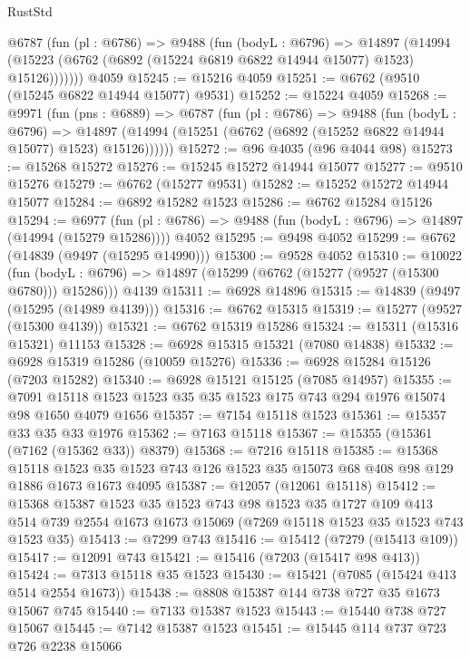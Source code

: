 \begin{lexlean}{RustStd}
\begin{coremodule}
      @6787
        (fun (pl : @6786) =>
        @9488
          (fun (bodyL : @6796) =>
          @14897
            (@14994 (@15223 (@6762 (@6892 (@15224 @6819 @6822 @14944 @15077) @1523) @15126)))))))
    @4059
@15245 := @15216 @4059
@15251 := @6762 (@9510 (@15245 @6822 @14944 @15077) @9531)
@15252 := @15224 @4059
@15268 := @9971
    (fun (pns : @6889) =>
    @6787
      (fun (pl : @6786) =>
      @9488
        (fun (bodyL : @6796) =>
        @14897 (@14994 (@15251 (@6762 (@6892 (@15252 @6822 @14944 @15077) @1523) @15126))))))
@15272 := @96 @4035 (@96 @4044 @98)
@15273 := @15268 @15272
@15276 := @15245 @15272 @14944 @15077
@15277 := @9510 @15276
@15279 := @6762 (@15277 @9531)
@15282 := @15252 @15272 @14944 @15077
@15284 := @6892 @15282 @1523
@15286 := @6762 @15284 @15126
@15294 := @6977
    (fun (pl : @6786) => @9488 (fun (bodyL : @6796) => @14897 (@14994 (@15279 @15286))))
    @4052
@15295 := @9498 @4052
@15299 := @6762 (@14839 (@9497 (@15295 @14990)))
@15300 := @9528 @4052
@15310 := @10022
    (fun (bodyL : @6796) => @14897 (@15299 (@6762 (@15277 (@9527 (@15300 @6780))) @15286)))
    @4139
@15311 := @6928 @14896
@15315 := @14839 (@9497 (@15295 (@14989 @4139)))
@15316 := @6762 @15315
@15319 := @15277 (@9527 (@15300 @4139))
@15321 := @6762 @15319 @15286
@15324 := @15311 (@15316 @15321) @11153
@15328 := @6928 @15315 @15321 (@7080 @14838)
@15332 := @6928 @15319 @15286 (@10059 @15276)
@15336 := @6928 @15284 @15126 (@7203 @15282)
@15340 := @6928 @15121 @15125 (@7085 @14957)
@15355 := @7091 @15118 @1523 @1523 @35 @35 @1523 @175 @743 @294 @1976 @15074 @98 @1650 @4079 @1656
@15357 := @7154 @15118 @1523
@15361 := @15357 @33 @35 @33 @1976
@15362 := @7163 @15118
@15367 := @15355 (@15361 (@7162 (@15362 @33)) @8379)
@15368 := @7216 @15118
@15385 := @15368
    @15118
    @1523
    @35
    @1523
    @743
    @126
    @1523
    @35
    @15073
    @68
    @408
    @98
    @129
    @1886
    @1673
    @1673
    @4095
@15387 := @12057 (@12061 @15118)
@15412 := @15368
    @15387
    @1523
    @35
    @1523
    @743
    @98
    @1523
    @35
    @1727
    @109
    @413
    @514
    @739
    @2554
    @1673
    @1673
    @15069
    (@7269 @15118 @1523 @35 @1523 @743 @1523 @35)
@15413 := @7299 @743
@15416 := @15412 (@7279 (@15413 @109))
@15417 := @12091 @743
@15421 := @15416 (@7203 (@15417 @98 @413))
@15424 := @7313 @15118 @35 @1523
@15430 := @15421 (@7085 (@15424 @413 @514 @2554 @1673))
@15438 := @8808 @15387 @144 @738 @727 @35 @1673 @15067 @745
@15440 := @7133 @15387 @1523
@15443 := @15440 @738 @727 @15067
@15445 := @7142 @15387 @1523
@15451 := @15445 @114 @737 @723 @726 @2238 @15066

\end{coremodule}
\end{lexlean}
